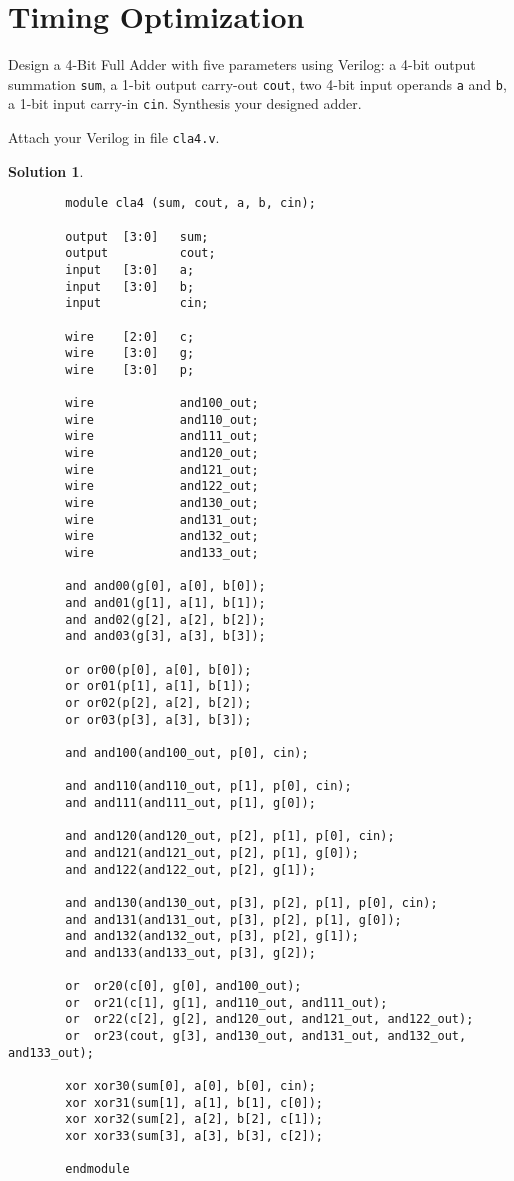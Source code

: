 \documentclass[acmlarge,screen=true,anonymous=false,11pt]{acmart}
\newtheorem*{solution*}{Solution}
\begin{document}
\section{Timing Optimization}
Design a 4-Bit Full Adder with five parameters using Verilog: a 4-bit output summation \texttt{sum}, a 1-bit output carry-out \texttt{cout}, two 4-bit input operands \texttt{a} and \texttt{b}, a 1-bit input carry-in \texttt{cin}. Synthesis your designed adder.
\begin{example}
    Attach your Verilog in file \texttt{cla4.v}.
\end{example}
\begin{solution*}
    \lstset{language=verilog,
        basicstyle=\ttfamily\scriptsize
    }
    \begin{lstlisting}
        module cla4 (sum, cout, a, b, cin);
        
        output  [3:0]   sum;
        output          cout;
        input   [3:0]   a;
        input   [3:0]   b;
        input           cin;
        
        wire    [2:0]   c;
        wire    [3:0]   g;
        wire    [3:0]   p;
        
        wire            and100_out;
        wire            and110_out;
        wire            and111_out;
        wire            and120_out;
        wire            and121_out;
        wire            and122_out;
        wire            and130_out;
        wire            and131_out;
        wire            and132_out;
        wire            and133_out;
        
        and and00(g[0], a[0], b[0]);
        and and01(g[1], a[1], b[1]);
        and and02(g[2], a[2], b[2]);
        and and03(g[3], a[3], b[3]);
        
        or or00(p[0], a[0], b[0]);
        or or01(p[1], a[1], b[1]);
        or or02(p[2], a[2], b[2]);
        or or03(p[3], a[3], b[3]);
        
        and and100(and100_out, p[0], cin);
        
        and and110(and110_out, p[1], p[0], cin);
        and and111(and111_out, p[1], g[0]);
        
        and and120(and120_out, p[2], p[1], p[0], cin);
        and and121(and121_out, p[2], p[1], g[0]);
        and and122(and122_out, p[2], g[1]);
        
        and and130(and130_out, p[3], p[2], p[1], p[0], cin);
        and and131(and131_out, p[3], p[2], p[1], g[0]);
        and and132(and132_out, p[3], p[2], g[1]);
        and and133(and133_out, p[3], g[2]);
        
        or  or20(c[0], g[0], and100_out);
        or  or21(c[1], g[1], and110_out, and111_out);
        or  or22(c[2], g[2], and120_out, and121_out, and122_out);
        or  or23(cout, g[3], and130_out, and131_out, and132_out, and133_out);
        
        xor xor30(sum[0], a[0], b[0], cin);
        xor xor31(sum[1], a[1], b[1], c[0]);
        xor xor32(sum[2], a[2], b[2], c[1]);
        xor xor33(sum[3], a[3], b[3], c[2]);
        
        endmodule
    \end{lstlisting}
\end{solution*}
\end{document}
